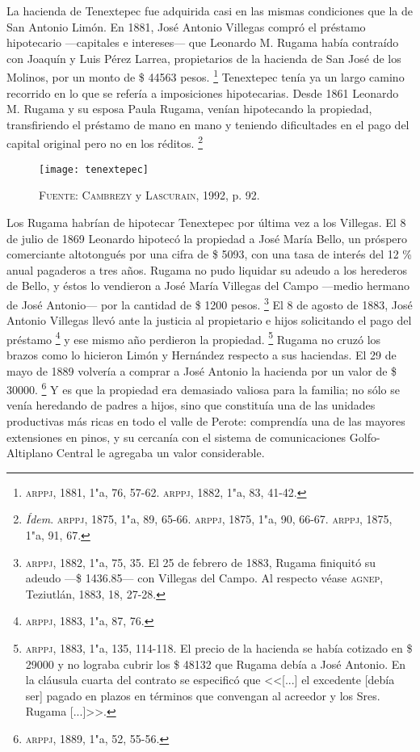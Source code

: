 \documentclass[14pt,twoside,final]{extbook} %
\let\oldfootnote\footnote
\renewcommand\footnote[1]{%
\oldfootnote{\hspace{1mm}#1}}
\begin{document}
La hacienda de Tenextepec fue adquirida casi en las mismas condiciones que la de San Antonio Limón. En 1881, José Antonio Villegas compró el préstamo hipotecario ---capitales e intereses--- que Leonardo M. Rugama había contraído con Joaquín y Luis Pérez Larrea, propietarios de la hacienda de San José de los Molinos, por un monto de \$ 44563 pesos.\footnote{\textsc{arppj}, 1881, 1"a, 76, 57-62. \textsc{arppj}, 1882, 1"a, 83, 41-42.} Tenextepec tenía ya un largo camino recorrido en lo que
se refería a imposiciones hipotecarias. Desde 1861 Leonardo M. Rugama y su esposa Paula Rugama, venían hipotecando la propiedad, transfiriendo el préstamo de mano en mano y teniendo dificultades en el pago del capital original pero no en los réditos.\footnote{\emph{Ídem}. \textsc{arppj}, 1875, 1"a, 89, 65-66. \textsc{arppj}, 1875, 1"a, 90, 66-67. \textsc{arppj}, 1875, 1"a, 91, 67.}
\begin{sidewaysfigure}
\centering
\texttt{[image: tenextepec]}
\caption[Plano de la hacienda de Tenextepec]{\textsc{Fuente:} \textsc{Cambrezy} y \textsc{Lascurain}, 1992, p. 92.}
\label{fig:hda-tenextepec}
\end{sidewaysfigure}

Los Rugama habrían de hipotecar Tenextepec por última vez a los Villegas. El 8 de julio de 1869 Leonardo hipotecó la propiedad a José María Bello, un próspero comerciante altotongués por una cifra de \$ 5093, con una tasa de interés del 12 \% anual pagaderos a tres años. Rugama no pudo liquidar su adeudo a los herederos de Bello, y éstos lo vendieron a José María Villegas del Campo ---medio hermano de José Antonio--- por la cantidad de \$ 1200 pesos.\footnote{\textsc{arppj}, 1882, 1"a, 75, 35. El 25 de febrero de 1883, Rugama finiquitó su adeudo ---\$ 1436.85--- con Villegas del Campo. Al respecto véase \textsc{agnep}, Teziutlán, 1883, 18, 27-28.} El 8 de agosto de 1883, José Antonio Villegas llevó ante la justicia al propietario e hijos solicitando el pago del préstamo\footnote{\textsc{arppj}, 1883, 1"a, 87, 76.} y ese mismo año perdieron la propiedad.\footnote{\textsc{arppj}, 1883, 1"a, 135, 114-118. El precio de la hacienda se había cotizado en \$ 29000 y no lograba cubrir los \$ 48132 que Rugama debía a José Antonio. En la cláusula cuarta del contrato se especificó que <<[...] el excedente [debía ser] pagado en plazos en términos que convengan al acreedor y los Sres. Rugama [...]>>.} Rugama no cruzó los brazos como lo hicieron
Limón y Hernández respecto a sus haciendas. El 29 de mayo de 1889 volvería a comprar a José Antonio la hacienda por un valor de \$ 30000.\footnote{\textsc{arppj}, 1889, 1"a, 52, 55-56.} Y es que la
propiedad era demasiado valiosa para la familia; no sólo se venía heredando de padres a hijos, sino que constituía una de las unidades productivas más ricas en todo el valle de Perote: comprendía una de las mayores extensiones en pinos, y su cercanía con el sistema de comunicaciones Golfo-Altiplano Central le agregaba un valor considerable.
\end{document}
